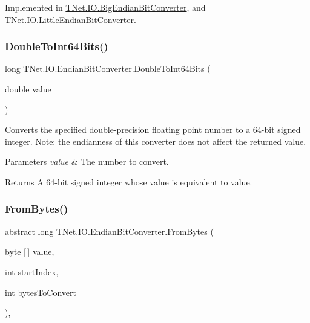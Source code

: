 Implemented in \mbox{\hyperlink{class_t_net_1_1_i_o_1_1_big_endian_bit_converter_a3fbb9a8e3f64036d8c8882a857ef4d38}{T\+Net.\+I\+O.\+Big\+Endian\+Bit\+Converter}}, and \mbox{\hyperlink{class_t_net_1_1_i_o_1_1_little_endian_bit_converter_ae620d0f512b18fc4ddaf7d1225dac136}{T\+Net.\+I\+O.\+Little\+Endian\+Bit\+Converter}}.

\mbox{\label{class_t_net_1_1_i_o_1_1_endian_bit_converter_ad7661c4bcea50caa14cd4d22110873a0}} 
\subsubsection{\texorpdfstring{Double\+To\+Int64\+Bits()}{DoubleToInt64Bits()}}
{\footnotesize\ttfamily long T\+Net.\+I\+O.\+Endian\+Bit\+Converter.\+Double\+To\+Int64\+Bits (\begin{DoxyParamCaption}\item[{double}]{value }\end{DoxyParamCaption})}



Converts the specified double-\/precision floating point number to a 64-\/bit signed integer. Note\+: the endianness of this converter does not affect the returned value. 


\begin{DoxyParams}{Parameters}
{\em value} & The number to convert. \\
\hline
\end{DoxyParams}
\begin{DoxyReturn}{Returns}
A 64-\/bit signed integer whose value is equivalent to value.
\end{DoxyReturn}
\mbox{\label{class_t_net_1_1_i_o_1_1_endian_bit_converter_a20baa5cfe592893363ad0574639a3002}} 
\subsubsection{\texorpdfstring{From\+Bytes()}{FromBytes()}}
{\footnotesize\ttfamily abstract long T\+Net.\+I\+O.\+Endian\+Bit\+Converter.\+From\+Bytes (\begin{DoxyParamCaption}\item[{byte \mbox{[}$\,$\mbox{]}}]{value,  }\item[{int}]{start\+Index,  }\item[{int}]{bytes\+To\+Convert }\end{DoxyParamCaption})\hspace{0.3cm}{\ttfamily [protected]}, {}}



